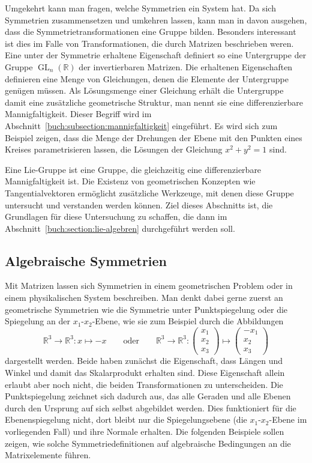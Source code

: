 Umgekehrt kann man fragen, welche Symmetrien ein System hat.
Da sich Symmetrien zusammensetzen und umkehren lassen, kann man in davon
ausgehen, dass die Symmetrietransformationen eine Gruppe bilden.
Besonders interessant ist dies im Falle von Transformationen, die
durch Matrizen beschrieben weren.
Eine unter der Symmetrie erhaltene Eigenschaft definiert so eine
Untergruppe der Gruppe $\operatorname{GL}_n(\mathbb{R})$ der
invertierbaren Matrizen.
Die erhaltenen Eigenschaften definieren eine Menge von Gleichungen,
denen die Elemente der Untergruppe genügen müssen.
Als Lösungsmenge einer Gleichung erhält die Untergruppe damit eine
zusätzliche geometrische Struktur, man nennt sie eine differenzierbare
Mannigfaltigkeit.
Dieser Begriff wird im Abschnitt~\ref{buch:subsection:mannigfaltigkeit}
eingeführt.
Es wird sich zum Beispiel zeigen, dass die Menge der Drehungen der
Ebene mit den Punkten eines Kreises parametrisieren lassen,
die Lösungen der Gleichung $x^2+y^2=1$ sind.

Eine Lie-Gruppe ist eine Gruppe, die gleichzeitig eine differenzierbare
Mannigfaltigkeit ist.
Die Existenz von geometrischen Konzepten wie Tangentialvektoren
ermöglicht zusätzliche Werkzeuge, mit denen diese Gruppe untersucht
und verstanden werden können.
Ziel dieses Abschnitts ist, die Grundlagen für diese Untersuchung zu
schaffen, die dann im Abschnitt~\ref{buch:section:lie-algebren}
durchgeführt werden soll.

\subsection{Algebraische Symmetrien
\label{buch:subsection:algebraische-symmetrien}}
Mit Matrizen lassen sich Symmetrien in einem geometrischen Problem
oder in einem physikalischen System beschreiben.
Man denkt dabei gerne zuerst an geometrische Symmetrien wie die
Symmetrie unter Punktspiegelung oder die Spiegelung an der $x_1$-$x_2$-Ebene,
wie sie zum Beispiel durch die Abbildungen
\[
\mathbb{R}^3\to\mathbb{R}^3 : x\mapsto -x
\qquad\text{oder}\qquad
\mathbb{R}^3\to\mathbb{R}^3 :
\begin{pmatrix}x_1\\x_2\\x_3\end{pmatrix}
\mapsto
\begin{pmatrix}-x_1\\x_2\\x_3\end{pmatrix}
\]
dargestellt werden.
Beide haben zunächst die Eigenschaft, dass Längen und Winkel und damit
das Skalarprodukt erhalten sind.
Diese Eigenschaft allein erlaubt aber noch nicht, die beiden Transformationen
zu unterscheiden.
Die Punktspiegelung zeichnet sich dadurch aus, das alle Geraden und alle
Ebenen durch den Ursprung auf sich selbst abgebildet werden.
Dies funktioniert für die Ebenenspiegelung nicht, dort bleibt nur die
Spiegelungsebene (die $x_1$-$x_2$-Ebene im vorliegenden Fall) und
ihre Normale erhalten.
Die folgenden Beispiele sollen zeigen, wie solche Symmetriedefinitionen
auf algebraische Bedingungen an die Matrixelemente führen.

